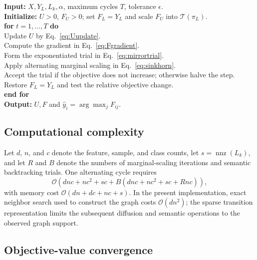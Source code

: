 \documentclass[times, review, 10pt]{elsarticle}
\begin{document}
\begin{algorithm}[t]
\caption{MCS-NMF}
\label{alg:mcsnmf}
\begin{minipage}{0.96\linewidth}
\small
\textbf{Input:} $X,Y_L,L_k,\alpha$, maximum cycles $T$, tolerance $\epsilon$.\\
\textbf{Initialize:} $U>0$, $F_U>0$; set $F_L=Y_L$ and scale $F_U$ into $\mathcal T(\pi_L)$.\\
\textbf{for} $t=1,\ldots,T$ \textbf{do}\\
\quad Update $U$ by Eq.~\eqref{eq:Uupdate}.\\
\quad Compute the gradient in Eq.~\eqref{eq:Fgradient}.\\
\quad Form the exponentiated trial in Eq.~\eqref{eq:mirrortrial}.\\
\quad Apply alternating marginal scaling in Eq.~\eqref{eq:sinkhorn}.\\
\quad Accept the trial if the objective does not increase; otherwise halve the step.\\
\quad Restore $F_L=Y_L$ and test the relative objective change.\\
\textbf{end for}\\
\textbf{Output:} $U,F$ and $\hat y_i=\arg\max_j F_{ij}$.
\end{minipage}
\end{algorithm}

\subsection{Computational complexity}

Let $d$, $n$, and $c$ denote the feature, sample, and class counts, let $s=\operatorname{nnz}(L_k)$, and let $R$ and $B$ denote the numbers of marginal-scaling iterations and semantic backtracking trials. One alternating cycle requires
\begin{equation}
\mathcal O\!\left(dnc+nc^2+sc+B(dnc+nc^2+sc+Rnc)\right),
\end{equation}
with memory cost $\mathcal O(dn+dc+nc+s)$. In the present implementation, exact neighbor search used to construct the graph costs $\mathcal O(dn^2)$; the sparse transition representation limits the subsequent diffusion and semantic operations to the observed graph support.

\subsection{Objective-value convergence}
\end{document}
